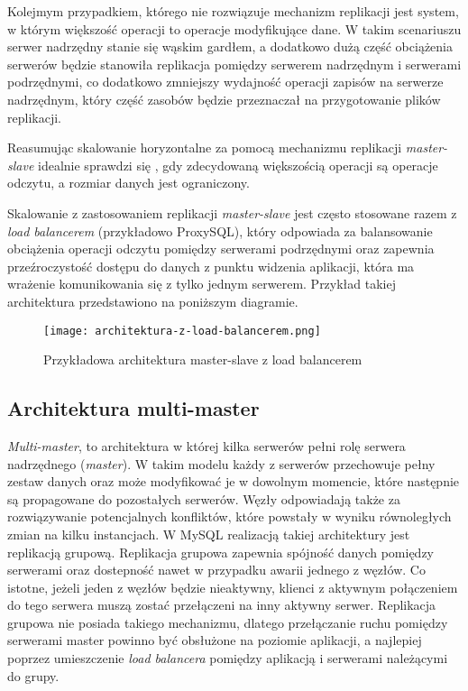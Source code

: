 Kolejmym przypadkiem, którego nie rozwiązuje mechanizm replikacji jest system, w którym większość operacji to operacje modyfikujące dane. W takim scenariuszu serwer nadrzędny stanie się wąskim gardłem, a dodatkowo dużą część obciążenia serwerów będzie stanowiła replikacja pomiędzy serwerem nadrzędnym i serwerami podrzędnymi, co dodatkowo zmniejszy wydajność operacji zapisów na serwerze nadrzędnym, który część zasobów będzie przeznaczał na przygotowanie plików replikacji.

Reasumując skalowanie horyzontalne za pomocą mechanizmu replikacji \textit{master-slave} idealnie sprawdzi się , gdy zdecydowaną większością operacji są operacje odczytu, a rozmiar danych jest ograniczony.

Skalowanie z zastosowaniem replikacji \textit{master-slave} jest często stosowane razem z \textit{load balancerem} (przykładowo ProxySQL), który odpowiada za balansowanie obciążenia operacji odczytu pomiędzy serwerami podrzędnymi oraz zapewnia przeźroczystość dostępu do danych z punktu widzenia aplikacji, która ma wrażenie komunikowania się z tylko jednym serwerem. Przykład takiej architektura przedstawiono na poniższym diagramie.

\begin{figure}[!h]
	\caption{Przykładowa architektura master-slave z load balancerem}
	\centering
	\texttt{[image: architektura-z-load-balancerem.png]}
	\label{fig:label}
\end{figure}

\subsection{Architektura multi-master}
\textit{Multi-master}, to architektura w której kilka serwerów pełni rolę serwera nadrzędnego (\textit{master}). W takim modelu każdy z serwerów przechowuje pełny zestaw danych oraz może modyfikować je w dowolnym momencie, które następnie są propagowane do pozostałych serwerów. Węzły odpowiadają także za rozwiązywanie potencjalnych konfliktów, które powstały w wyniku równoległych zmian na kilku instancjach. W MySQL realizacją takiej architektury jest replikacją grupową. Replikacja grupowa zapewnia spójność danych pomiędzy serwerami oraz dostepność nawet w przypadku awarii jednego z węzłów. Co istotne, jeżeli jeden z węzłów będzie nieaktywny, klienci z aktywnym połączeniem do tego serwera muszą zostać przełączeni na inny aktywny serwer. Replikacja grupowa nie posiada takiego mechanizmu, dlatego przełączanie ruchu pomiędzy serwerami master powinno być obsłużone na poziomie aplikacji, a najlepiej poprzez umieszczenie \textit{load balancera} pomiędzy aplikacją i serwerami należącymi do grupy.

